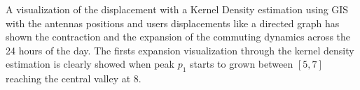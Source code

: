A visualization of the displacement with a Kernel Density estimation using GIS with the antennas positions and users displacements like a directed graph has shown the contraction and the expansion of the commuting dynamics across the 24 hours of the day. The firsts expansion visualization through the kernel density estimation is clearly showed when peak $p_1$ starts to grown between $[5,7]$ reaching the central valley at $8$.

\newpage

\begin{figure}
\centering
{}
\end{figure}
